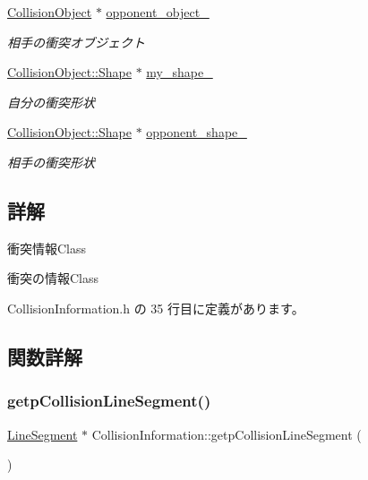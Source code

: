 \begin{DoxyCompactItemize}
\mbox{\hyperlink{class_collision_object}{Collision\+Object}} $\ast$ \mbox{\hyperlink{class_collision_information_a0050ea8230d1d6ec83d2859ac71be20f}{opponent\+\_\+object\+\_\+}}
\begin{DoxyCompactList}\small\item\em 相手の衝突オブジェクト \end{DoxyCompactList}\item 
\mbox{\hyperlink{class_collision_object_1_1_shape}{Collision\+Object\+::\+Shape}} $\ast$ \mbox{\hyperlink{class_collision_information_a957182758520f6f3e3cbca3228d44262}{my\+\_\+shape\+\_\+}}
\begin{DoxyCompactList}\small\item\em 自分の衝突形状 \end{DoxyCompactList}\item 
\mbox{\hyperlink{class_collision_object_1_1_shape}{Collision\+Object\+::\+Shape}} $\ast$ \mbox{\hyperlink{class_collision_information_ab09b1a156c939f009f7c72be1dcfa917}{opponent\+\_\+shape\+\_\+}}
\begin{DoxyCompactList}\small\item\em 相手の衝突形状 \end{DoxyCompactList}\end{DoxyCompactItemize}


\subsection{詳解}
衝突情報\+Class 

衝突の情報\+Class 

 Collision\+Information.\+h の 35 行目に定義があります。



\subsection{関数詳解}
\mbox{\label{class_collision_information_a44fe1a01d5b65b29181d01fa164b7dd5}} 
\subsubsection{\texorpdfstring{getp\+Collision\+Line\+Segment()}{getpCollisionLineSegment()}}
{\footnotesize\ttfamily \mbox{\hyperlink{class_line_segment}{Line\+Segment}} $\ast$ Collision\+Information\+::getp\+Collision\+Line\+Segment (\begin{DoxyParamCaption}{ }\end{DoxyParamCaption})}



